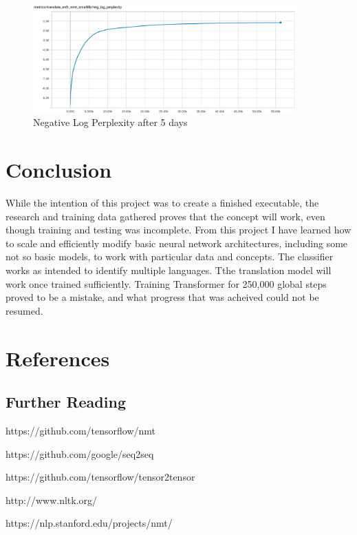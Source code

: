 \documentclass[10pt,a4paper]{article}
\begin{document}
\begin{figure}[H]
  \begin{center}
    \includegraphics[width=0.9\textwidth] {neg_log_perp.png}
    \caption{Negative Log Perplexity after 5 days}
  \end{center}
\end{figure}


\section{Conclusion}


While the intention of this project was to create a finished executable, the research and training data gathered proves that the concept will work, even though training and testing was incomplete. From this project I have learned how to scale and efficiently modify basic neural network architectures, including some not so basic models, to work with particular data and concepts. The classifier works as intended to identify multiple languages. Tthe translation model will work once trained sufficiently. Training Transformer for 250,000 global steps proved to be a mistake, and what progress that was acheived could not be resumed.


\clearpage
\section{References}


\subsection{Further Reading}

https://github.com/tensorflow/nmt

https://github.com/google/seq2seq

https://github.com/tensorflow/tensor2tensor

http://www.nltk.org/

https://nlp.stanford.edu/projects/nmt/
\end{document}
